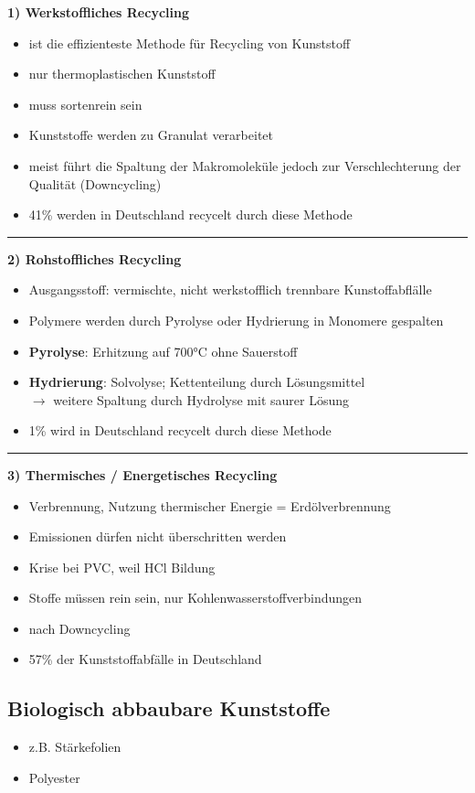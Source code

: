 \begin{multicols}{2}

    \textbf{1) Werkstoffliches Recycling} 
    \begin{itemize}
        \item ist die effizienteste Methode für Recycling von Kunststoff
        \item nur thermoplastischen Kunststoff
        \item muss sortenrein sein
        \item Kunststoffe werden zu Granulat verarbeitet
        \item meist führt die Spaltung der Makromoleküle jedoch zur Verschlechterung der Qualität (Downcycling)
        \item 41\% werden in Deutschland recycelt durch diese Methode
    \end{itemize}

\end{multicols}
\hrule
\vspace{0.3cm}
\begin{multicols}{2}

    \textbf{2) Rohstoffliches Recycling} 
    \begin{itemize}
        \item Ausgangsstoff: vermischte, nicht werkstofflich trennbare Kunstoffabflälle
        \item Polymere werden durch Pyrolyse oder Hydrierung in Monomere gespalten
        \item \textbf{Pyrolyse}: Erhitzung auf 700°C ohne Sauerstoff
        \item \textbf{Hydrierung}: Solvolyse; Kettenteilung durch Lösungsmittel \\
            $\rightarrow$ weitere Spaltung durch Hydrolyse mit saurer Lösung
        \item 1\% wird in Deutschland recycelt durch diese Methode
    \end{itemize}

\end{multicols}
\hrule
\vspace{0.3cm}
\begin{multicols}{2}

    \textbf{3) Thermisches / Energetisches Recycling}
    \begin{itemize}
        \item Verbrennung, Nutzung thermischer Energie = Erdölverbrennung
        \item Emissionen dürfen nicht überschritten werden
        \item Krise bei PVC, weil HCl Bildung
        \item Stoffe müssen rein sein, nur Kohlenwasserstoffverbindungen
        \item nach Downcycling
        \item 57\% der Kunststoffabfälle in Deutschland
    \end{itemize}

\end{multicols}

\subsection{Biologisch abbaubare Kunststoffe}
\begin{itemize}
    \item z.B. Stärkefolien
    \item Polyester
\end{itemize}

